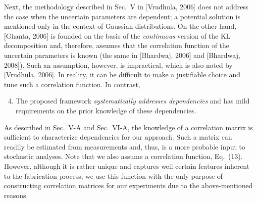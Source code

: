 \begin{authors}
Next, the methodology described in Sec.~V in [Vrudhula, 2006] does not address the case when the uncertain parameters are dependent; a potential solution is mentioned only in the context of Gaussian distributions.
On the other hand, [Ghanta, 2006] is founded on the basis of the \emph{continuous} version of the KL decomposition and, therefore, assumes that the correlation function of the uncertain parameters is known (the same in [Bhardwaj, 2006] and [Bhardwaj, 2008]).
Such an assumption, however, is impractical, which is also noted by [Vrudhula, 2006].
In reality, it can be difficult to make a justifiable choice and tune such a correlation function.
In contrast,
\begin{enumerate}
  \setcounter{enumi}{3}
  \item The proposed framework \emph{systematically addresses dependencies} and has mild requirements on the prior knowledge of these dependencies.
\end{enumerate}
As described in Sec.~V-A and Sec.~VI-A, the knowledge of a correlation matrix is sufficient to characterize dependencies for our approach.
Such a matrix can readily be estimated from measurements and, thus, is a more probable input to stochastic analyses.
Note that we also assume a correlation function, Eq.~(13).
However, although it is rather unique and captures well certain features inherent to the fabrication process, we use this function with the only purpose of constructing correlation matrices for our experiments due to the above-mentioned reasons.


\end{authors}
